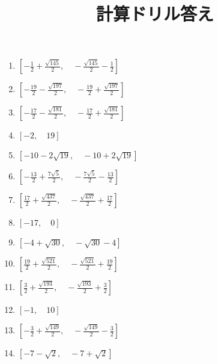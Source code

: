 \documentclass[9pt,dvipdfmx,a4paper]{article}
\begin{document}
    
\title{計算ドリル答え} 
\date{} 
\maketitle
\begin{multicols}{2}
 \begin{enumerate}

\item
$ \left [ - \frac{1}{2} + \frac{\sqrt{145}}{2}, \quad - \frac{\sqrt{145}}{2} - \frac{1}{2}\right ]$

\item
$ \left [ - \frac{19}{2} - \frac{\sqrt{197}}{2}, \quad - \frac{19}{2} + \frac{\sqrt{197}}{2}\right ]$

\item
$ \left [ - \frac{17}{2} - \frac{\sqrt{181}}{2}, \quad - \frac{17}{2} + \frac{\sqrt{181}}{2}\right ]$

\item
$ \left [ -2, \quad 19\right ]$

\item
$ \left [ -10 - 2 \sqrt{19}, \quad -10 + 2 \sqrt{19}\right ]$

\item
$ \left [ - \frac{13}{2} + \frac{7 \sqrt{5}}{2}, \quad - \frac{7 \sqrt{5}}{2} - \frac{13}{2}\right ]$

\item
$ \left [ \frac{17}{2} + \frac{\sqrt{437}}{2}, \quad - \frac{\sqrt{437}}{2} + \frac{17}{2}\right ]$

\item
$ \left [ -17, \quad 0\right ]$

\item
$ \left [ -4 + \sqrt{30}, \quad - \sqrt{30} - 4\right ]$

\item
$ \left [ \frac{19}{2} + \frac{\sqrt{521}}{2}, \quad - \frac{\sqrt{521}}{2} + \frac{19}{2}\right ]$

\item
$ \left [ \frac{3}{2} + \frac{\sqrt{193}}{2}, \quad - \frac{\sqrt{193}}{2} + \frac{3}{2}\right ]$

\item
$ \left [ -1, \quad 10\right ]$

\item
$ \left [ - \frac{3}{2} + \frac{\sqrt{149}}{2}, \quad - \frac{\sqrt{149}}{2} - \frac{3}{2}\right ]$

\item
$ \left [ -7 - \sqrt{2}, \quad -7 + \sqrt{2}\right ]$


\end{enumerate}
\end{multicols}
\end{document}
